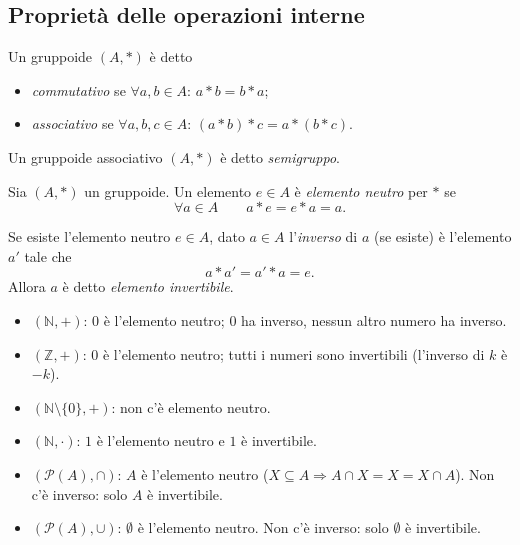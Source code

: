 \documentclass[11pt,a4paper]{article}
\begin{document}
\subsection{Proprietà delle operazioni interne}

\begin{definizione}
Un gruppoide $(A, *)$ è detto
\begin{itemize}
  \item \emph{commutativo} se $\forall a, b \in A$: $a * b = b * a$;
  \item \emph{associativo} se $\forall a, b, c \in A$: $(a * b) * c = a * (b * c)$.
\end{itemize}
Un gruppoide associativo $(A, *)$ è detto \emph{semigruppo}.
\end{definizione}

\begin{definizione}
Sia $(A, *)$ un gruppoide. Un elemento $e \in A$ è \emph{elemento neutro} per $*$ se
\[
  \forall a \in A \qquad a * e = e * a = a .
\]
\end{definizione}

\begin{definizione}
Se esiste l'elemento neutro $e \in A$, dato $a \in A$ l'\emph{inverso} di $a$ (se esiste) è l'elemento $a'$ tale che
\[
  a * a' = a' * a = e .
\]
Allora $a$ è detto \emph{elemento invertibile}.
\end{definizione}

\begin{esempio}
\begin{itemize}
  \item $(\mathbb{N}, +)$: $0$ è l'elemento neutro; $0$ ha inverso, nessun altro numero ha inverso.
  \item $(\mathbb{Z}, +)$: $0$ è l'elemento neutro; tutti i numeri sono invertibili (l'inverso di $k$ è $-k$).
  \item $(\mathbb{N}\setminus\{0\}, +)$: non c'è elemento neutro.
  \item $(\mathbb{N}, \cdot)$: $1$ è l'elemento neutro e $1$ è invertibile.
  \item $(\mathcal{P}(A), \cap)$: $A$ è l'elemento neutro ($X \subseteq A \Rightarrow A \cap X = X = X \cap A$). Non c'è inverso: solo $A$ è invertibile.
  \item $(\mathcal{P}(A), \cup)$: $\emptyset$ è l'elemento neutro. Non c'è inverso: solo $\emptyset$ è invertibile.
\end{itemize}
\end{esempio}
\end{document}
